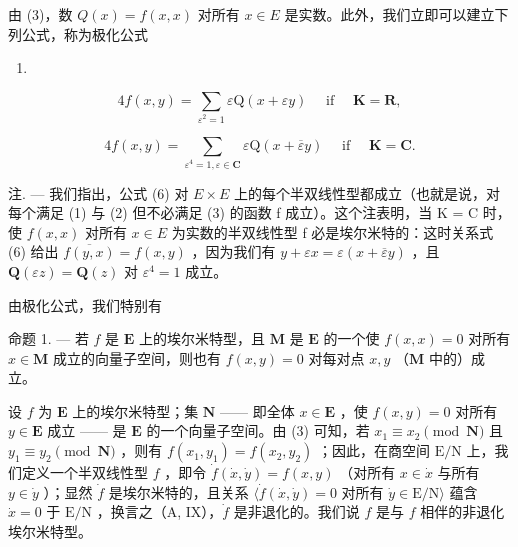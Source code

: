 由 (3)，数 \(Q(x) = f(x, x)\) 对所有 \(x \in E\) 是实数。此外，我们立即可以建立下列公式，称为极化公式

\begin{enumerate}
\def\labelenumi{(\arabic{enumi})}
\setcounter{enumi}{4}
\tightlist
\item
\end{enumerate}

\[
4 f (x, y) = \sum_ {\varepsilon^ {2} = 1} \varepsilon \mathrm{Q} (x + \varepsilon y) \quad \text { if } \quad \mathbf {K} = \mathbf {R},\tag{6}
\]

\[
4 f (x, y) = \sum_ {\varepsilon^ {4} = 1, \varepsilon \in \mathbf {C}} \varepsilon \mathrm{Q} (x + \overline {{{\varepsilon}}} y) \quad \text { if } \quad \mathbf {K} = \mathbf {C}.
\]

注. --- 我们指出，公式 (6) 对 \(E \times E\) 上的每个半双线性型都成立（也就是说，对每个满足 (1) 与 (2) 但不必满足 (3) 的函数 f 成立）。这个注表明，当 K = C 时，使 \(f(x, x)\) 对所有 \(x \in E\) 为实数的半双线性型 f 必是埃尔米特的：这时关系式 (6) 给出 \(\overline{f(y, x)} = f(x, y)\) ，因为我们有 \(y + \varepsilon x = \varepsilon(x + \overline{\varepsilon}y)\) ，且 \(\mathbf{Q}(\varepsilon z) = \mathbf{Q}(z)\) 对 \(\varepsilon^{4} = 1\) 成立。

由极化公式，我们特别有

命题 1. --- 若 \(f\) 是 \(\mathbf{E}\) 上的埃尔米特型，且 \(\mathbf{M}\) 是 \(\mathbf{E}\) 的一个使 \(f(x, x) = 0\) 对所有 \(x \in \mathbf{M}\) 成立的向量子空间，则也有 \(f(x, y) = 0\) 对每对点 \(x, y\) （\(\mathbf{M}\) 中的）成立。

设 \(f\) 为 \(\mathbf{E}\) 上的埃尔米特型；集 \(\mathbf{N}\) —— 即全体 \(x \in \mathbf{E}\) ，使 \(f(x, y) = 0\) 对所有 \(y \in \mathbf{E}\) 成立 —— 是 \(\mathbf{E}\) 的一个向量子空间。由 (3) 可知，若 \(x_1 \equiv x_2 \pmod{\mathbf{N}}\) 且 \(y_1 \equiv y_2 \pmod{\mathbf{N}}\) ，则有 \(f(x_1, y_1) = f(x_2, y_2)\) ；因此，在商空间 \(\mathrm{E/N}\) 上，我们定义一个半双线性型 \(f\) ，即令 \(\dot{f}(\dot{x}, \dot{y}) = f(x, y)\) （对所有 \(x \in \dot{x}\) 与所有 \(y \in \dot{y}\) ）；显然 \(\dot{f}\) 是埃尔米特的，且关系 \(\langle \dot{f}(\dot{x}, \dot{y}) = 0 \text{ 对所有 } \dot{y} \in \mathrm{E/N} \rangle\) 蕴含 \(\dot{x} = 0 \text{ 于 } \mathrm{E/N}\) ，换言之（A, IX），\(\dot{f}\) 是非退化的。我们说 \(f\) 是与 \(f\) 相伴的非退化埃尔米特型。

